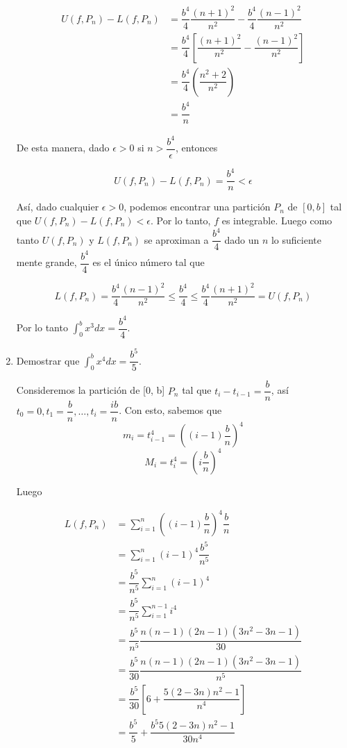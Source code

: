\documentclass{report}
\begin{document}
\begin{enumerate}
        \begin{align*}
            U(f, P_n) - L(f, P_n) &= \dfrac{b^4}{4} \dfrac{(n+1)^2}{n^2} - \dfrac{b^4}{4} \dfrac{(n-1)^2}{n^2}\\
            &= \dfrac{b^4}{4} \left[\dfrac{(n+1)^2}{n^2} - \dfrac{(n-1)^2}{n^2}\right]\\
            &= \dfrac{b^4}{4} \left(\dfrac{n^2+2}{n^2}\right)\\
            &= \dfrac{b^4}{n}
        \end{align*}

        De esta manera, dado $\epsilon > 0$ si $n > \dfrac{b^4}{\epsilon}$, entonces

        $$U(f, P_n) - L(f, P_n) = \dfrac{b^4}{n} < \epsilon$$

        Así, dado cualquier $\epsilon > 0$, podemos encontrar una partición $P_n$ de $[0,b]$ tal que $U(f, P_n) - L(f, P_n) < \epsilon$. Por lo tanto, $f$ es integrable. Luego como tanto $U(f, P_n)$ y $L(f, P_n)$ se aproximan a $\dfrac{b^4}{4}$ dado un $n$ lo suficiente mente grande, $\dfrac{b^4}{4}$ es el único número tal que

        $$L(f, P_n) = \dfrac{b^4}{4} \dfrac{(n-1)^2}{n^2} \leq \dfrac{b^4}{4} \leq \dfrac{b^4}{4} \dfrac{(n+1)^2}{n^2} = U(f, P_n)$$

        Por lo tanto $\int_{0}^{b} x^3 dx = \dfrac{b^4}{4}$.

        \item Demostrar que $\int_{0}^{b}x^4dx = \dfrac{b^5}{5}$.

        Consideremos la partición de [0, b] $P_n$ tal que $t_i - t_{i-1} = \dfrac{b}{n}$, así $t_0 = 0, t_1 = \dfrac{b}{n}, \dots , t_i =\dfrac{ib}{n}$. Con esto, sabemos que
        $$m_i = t_{i-1}^4 = \left((i-1)\dfrac{b}{n}\right)^4$$
        $$M_i = t_{i}^4 = \left(i\dfrac{b}{n}\right)^4$$

        Luego

        \begin{align*}
            L(f, P_n) &= \sum_{i=1}^{n}\left((i-1)\dfrac{b}{n}\right)^4\dfrac{b}{n}\\
            &= \sum_{i=1}^{n}(i-1)^4\dfrac{b^5}{n^5}\\
            &= \dfrac{b^5}{n^5} \sum_{i=1}^{n}(i-1)^4\\
            &= \dfrac{b^5}{n^5} \sum_{i=1}^{n-1}i^4\\
            &= \dfrac{b^5}{n^5} \dfrac{n(n-1)(2n-1)(3n^2-3n-1)}{30}\\
            &= \dfrac{b^5}{30} \dfrac{n(n-1)(2n-1)(3n^2-3n-1)}{n^5}\\
            &= \dfrac{b^5}{30} \left[6 + \dfrac{5(2-3n)n^2-1}{n^4}\right]\\
            &= \dfrac{b^5}{5} + \dfrac{b^5 5(2-3n)n^2-1}{30n^4}
        \end{align*}


\end{enumerate}
\end{document}
